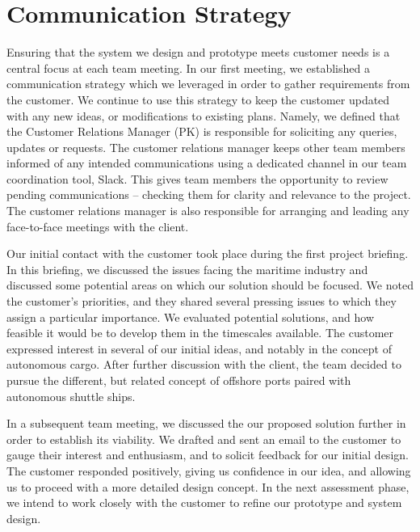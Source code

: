 \section{Communication Strategy}

Ensuring that the system we design and prototype meets customer needs is a central focus at each team meeting. In our first meeting, we established a communication strategy which we leveraged in order to gather requirements from the customer. We continue to use this strategy to keep the customer updated with any new ideas, or modifications to existing plans. Namely, we defined that the Customer Relations Manager (PK) is responsible for soliciting any queries, updates or requests. The customer relations manager keeps other team members informed of any intended communications using a dedicated channel in our team coordination tool, Slack. This gives team members the opportunity to review pending communications -- checking them for clarity and relevance to the project. The customer relations manager is also responsible for arranging and leading any face-to-face meetings with the client.

Our initial contact with the customer took place during the first project briefing. In this briefing, we discussed the issues facing the maritime industry and discussed some potential areas on which our solution should be focused. We noted the customer’s priorities, and they shared several pressing issues to which they assign a particular importance. We evaluated potential solutions, and how feasible it would be to develop them in the timescales available. The customer expressed interest in several of our initial ideas, and notably in the concept of autonomous cargo. After further discussion with the client, the team decided to pursue the different, but related concept of offshore ports paired with autonomous shuttle ships.

In a subsequent team meeting, we discussed the our proposed solution further in order to establish its viability. We drafted and sent an email to the customer to gauge their interest and enthusiasm, and to solicit feedback for our initial design. The customer responded positively, giving us confidence in our idea, and allowing us to proceed with a more detailed design concept. In the next assessment phase, we intend to work closely with the customer to refine our prototype and system design.
